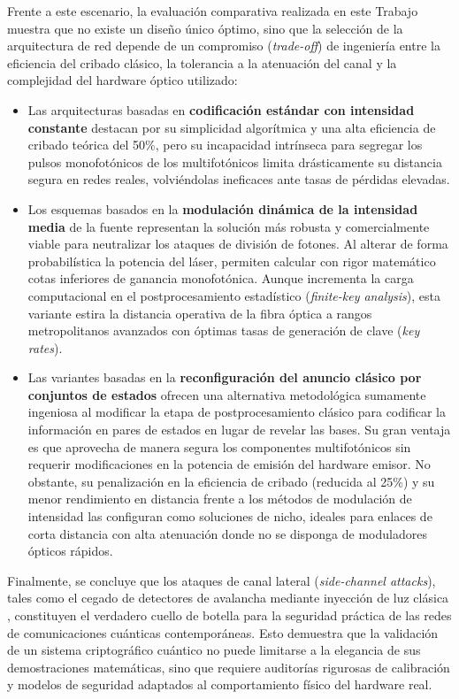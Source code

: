 Frente a este escenario, la evaluación comparativa realizada en este Trabajo muestra que no existe un diseño único óptimo, sino que la selección de la arquitectura de red depende de un compromiso (\emph{trade-off}) de ingeniería entre la eficiencia del cribado clásico, la tolerancia a la atenuación del canal y la complejidad del hardware óptico utilizado:
\begin{itemize}
    \item Las arquitecturas basadas en \textbf{codificación estándar con intensidad constante} destacan por su simplicidad algorítmica y una alta eficiencia de cribado teórica del 50\%, pero su incapacidad intrínseca para segregar los pulsos monofotónicos de los multifotónicos limita drásticamente su distancia segura en redes reales, volviéndolas ineficaces ante tasas de pérdidas elevadas.
    \item Los esquemas basados en la \textbf{modulación dinámica de la intensidad media} de la fuente representan la solución más robusta y comercialmente viable para neutralizar los ataques de división de fotones. Al alterar de forma probabilística la potencia del láser, permiten calcular con rigor matemático cotas inferiores de ganancia monofotónica. Aunque incrementa la carga computacional en el postprocesamiento estadístico (\emph{finite-key analysis}), esta variante estira la distancia operativa de la fibra óptica a rangos metropolitanos avanzados con óptimas tasas de generación de clave (\emph{key rates}).
    \item Las variantes basadas en la \textbf{reconfiguración del anuncio clásico por conjuntos de estados} ofrecen una alternativa metodológica sumamente ingeniosa al modificar la etapa de postprocesamiento clásico para codificar la información en pares de estados en lugar de revelar las bases. Su gran ventaja es que aprovecha de manera segura los componentes multifotónicos sin requerir modificaciones en la potencia de emisión del hardware emisor. No obstante, su penalización en la eficiencia de cribado (reducida al 25\%) y su menor rendimiento en distancia frente a los métodos de modulación de intensidad las configuran como soluciones de nicho, ideales para enlaces de corta distancia con alta atenuación donde no se disponga de moduladores ópticos rápidos.
\end{itemize}

Finalmente, se concluye que los ataques de canal lateral (\emph{side-channel attacks}), tales como el cegado de detectores de avalancha mediante inyección de luz clásica \citep{lydersen2010}, constituyen el verdadero cuello de botella para la seguridad práctica de las redes de comunicaciones cuánticas contemporáneas. Esto demuestra que la validación de un sistema criptográfico cuántico no puede limitarse a la elegancia de sus demostraciones matemáticas, sino que requiere auditorías rigurosas de calibración y modelos de seguridad adaptados al comportamiento físico del hardware real.

